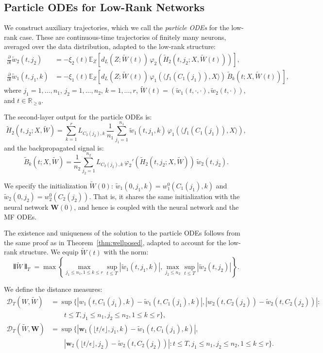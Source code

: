 \subsection{Particle ODEs for Low-Rank Networks}

We construct auxiliary trajectories, which we call the \textit{particle ODEs} for the low-rank case. These are continuous-time trajectories of finitely many neurons, averaged over the data distribution, adapted to the low-rank structure:
\begin{align*}
\frac{\partial}{\partial t}\tilde{w}_2(t, j_2) &= -\xi_2(t)\mathbb{E}_Z\left[d_L(Z; \tilde{W}(t))\,\varphi_2(\tilde{H}_2(t, j_2; X, \tilde{W}(t)))\right],\\
\frac{\partial}{\partial t}\tilde{w}_1(t, j_1, k) &= -\xi_1(t)\mathbb{E}_Z\left[d_L(Z; \tilde{W}(t))\,\varphi_1(\langle f_1(C_1(j_1)), X\rangle)\,\tilde{B}_k(t; X, \tilde{W}(t))\right],
\end{align*}
where $j_1 = 1, \ldots, n_1$, $j_2 = 1, \ldots, n_2$, $k = 1, \ldots, r$, $\tilde{W}(t) = (\tilde{w}_1(t, \cdot, \cdot), \tilde{w}_2(t, \cdot))$, and $t \in \mathbb{R}_{\ge 0}$. 

The second-layer output for the particle ODEs is:
\[
\tilde{H}_2(t, j_2; X, \tilde{W}) = \sum_{k=1}^r L_{C_2(j_2),k}\,\frac{1}{n_1}\sum_{j_1=1}^{n_1} \tilde{w}_1(t, j_1, k)\,\varphi_1(\langle f_1(C_1(j_1)), X\rangle),
\]
and the backpropagated signal is:
\[
\tilde{B}_k(t; X, \tilde{W}) = \frac{1}{n_2}\sum_{j_2=1}^{n_2} L_{C_2(j_2),k}\,\varphi_2'(\tilde{H}_2(t, j_2; X, \tilde{W}))\,\tilde{w}_2(t, j_2).
\]

We specify the initialization $\tilde{W}(0)$: $\tilde{w}_1(0, j_1, k) = w_1^0(C_1(j_1), k)$ and $\tilde{w}_2(0, j_2) = w_2^0(C_2(j_2))$. That is, it shares the same initialization with the neural network $\mathbf{W}(0)$, and hence is coupled with the neural network and the MF ODEs.

The existence and uniqueness of the solution to the particle ODEs follows from the same proof as in Theorem~\ref{thm:wellposed}, adapted to account for the low-rank structure. We equip $\tilde{W}(t)$ with the norm:
\[
\interleave\tilde{W}\interleave_T = \max\left\{\max_{j_1 \le n_1, 1 \le k \le r}\sup_{t \le T}|\tilde{w}_1(t, j_1, k)|, \max_{j_2 \le n_2}\sup_{t \le T}|\tilde{w}_2(t, j_2)|\right\}.
\]

We define the distance measures:
\begin{align*}
\mathscr{D}_T(W, \tilde{W}) &= \sup\Big\{|w_1(t, C_1(j_1), k) - \tilde{w}_1(t, C_1(j_1), k)|, |w_2(t, C_2(j_2)) - \tilde{w}_2(t, C_2(j_2))|:\\
&\qquad t \le T, j_1 \le n_1, j_2 \le n_2, 1 \le k \le r\Big\},\\
\mathscr{D}_T(\tilde{W}, \mathbf{W}) &= \sup\Big\{|\mathbf{w}_1(\lfloor t/\epsilon\rfloor, j_1, k) - \tilde{w}_1(t, C_1(j_1), k)|,\\
&\qquad |\mathbf{w}_2(\lfloor t/\epsilon\rfloor, j_2) - \tilde{w}_2(t, C_2(j_2))|: t \le T, j_1 \le n_1, j_2 \le n_2, 1 \le k \le r\Big\}.
\end{align*}

